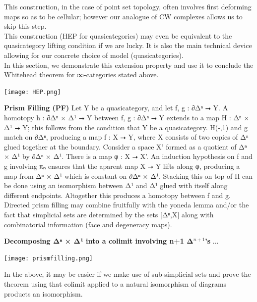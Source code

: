 \documentclass{book}
\theoremstyle{definition}
\begin{document}
This construction, in the case of point set topology, often involves first deforming maps so as to be cellular; however our analogue of CW complexes allows us to skip this step.\\

This construction (HEP for quasicategories) may even be equivalent to the quasicategory lifting condition if we are lucky. It is also the main technical device allowing for our concrete choice of model (quasicategories).\\

In this section, we demonstrate this extension property and use it to conclude the Whitehead theorem for ∞-categories stated above.\\

\begin{center}
\texttt{[image: HEP.png]}
\end{center}

{\bf Prism Filling (PF)} Let Y be a quasicategory, and let f, g : ∂Δⁿ ⭢ Y. A homotopy h : ∂Δⁿ × Δ¹ ⭢ Y between f, g : ∂Δⁿ ⭢ Y extends to a map H : Δⁿ × Δ¹ ⭢ Y; this follows from the condition that Y be a quasicategory. H(-,1) and g match on ∂Δⁿ, producing a map f : X ⭢ Y, where X consists of two copies of Δⁿ glued together at the boundary. Consider a space X' formed as a quotient of Δⁿ × Δ¹ by ∂Δⁿ × Δ¹. There is a map φ : X ⭢ X'. An induction hypothesis on f and g involving πₙ ensures that the aparent map X ⭢ Y lifts along φ, producing a map from Δⁿ × Δ¹ which is constant on ∂Δⁿ × Δ¹. Stacking this on top of H can be done using an isomorphism between Δ¹ and Δ¹ glued with itself along different endpoints. Altogether this produces a homotopy between f and g.\\

Directed prism filling may combine fruitfully with the yoneda lemma and/or the fact that simplicial sets are determined by the sets [Δⁿ,X] along with combinatorial information (face and degeneracy maps).

{\bf Decomposing Δⁿ × Δ¹ into a colimit involving n+1 Δ${}^{n+1}$'s} ...

\begin{center}
\texttt{[image: prismfilling.png]}
\end{center}

In the above, it may be easier if we make use of sub-simplicial sets and prove the theorem using that colimit applied to a natural isomorphism of diagrams products an isomorphism.\\
\end{document}
